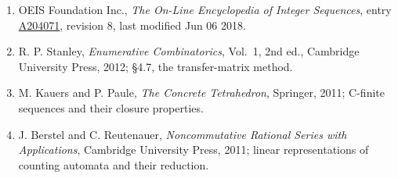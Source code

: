 \documentclass[11pt]{article}
\theoremstyle{definition}
\begin{document}
\begin{enumerate}

\item OEIS Foundation Inc., \emph{The On-Line Encyclopedia of Integer Sequences}, entry \href{https://oeis.org/A204071}{A204071}, revision 8, last modified Jun 06 2018.

\item R. P. Stanley, \emph{Enumerative Combinatorics}, Vol.~1, 2nd ed., Cambridge University Press, 2012; \S4.7, the transfer-matrix method.

\item M. Kauers and P. Paule, \emph{The Concrete Tetrahedron}, Springer, 2011; C-finite sequences and their closure properties.

\item J. Berstel and C. Reutenauer, \emph{Noncommutative Rational Series with Applications}, Cambridge University Press, 2011; linear representations of counting automata and their reduction.

\end{enumerate}
\end{document}
